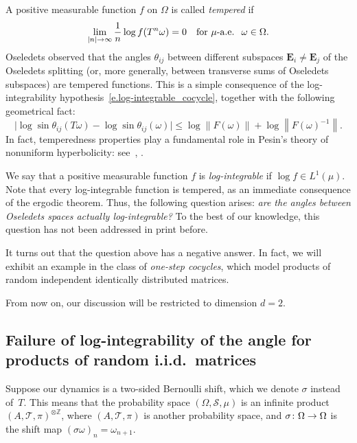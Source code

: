 \documentclass[10pt]{amsart}
\theoremstyle{definition}\newtheorem{defi}[theo]{Definition}\newtheorem{rema}[theo]{Remark}\newtheorem{exam}[theo]{Example}\newtheorem{exem}[theo]{Example}\newtheorem{nota}[theo]{Notation}
\newcommand{\Z}{\mathbb{Z}}
\newcommand{\E}{\mathbf{E}}
\newcommand{\clS}{\mathcal{S}}
\newcommand{\clT}{\mathcal{T}}
\renewcommand*{\to}{\mathchoice{\longrightarrow}{\rightarrow}{\rightarrow}{\rightarrow}}
\begin{document}
A positive measurable function $f$ on $\Omega$ is called \emph{tempered} if
\begin{equation}
\lim_{|n| \to \infty} \frac{1}{n} \log f(T^n \omega) = 0 \quad \text{for $\mu$-a.e. }\;\omega \in \Omega.
\end{equation}
Oseledets observed that the angles $\theta_{ij}$ between different subspaces $\E_i\neq \E_j$ of the Oseledets splitting (or, more generally, between transverse sums of Oseledets subspaces) are tempered functions. This is a simple consequence of the log-integrability hypothesis~\eqref{e.log-integrable_cocycle}, together with the following geometrical fact:
\begin{equation}\label{e.paralleloram}
\bigl| \log \sin \theta_{ij}(T \omega) - \log \sin \theta_{ij}(\omega) \bigr|
\le \log \|F(\omega)\| + \log \left\|F(\omega)^{-1}\right\|.
\end{equation}
In fact, temperedness properties play a fundamental role in Pesin's theory of nonuniform hyperbolicity: see~\cite{barreira}, \cite[Supplement]{KH}.

We say that a positive measurable function $f$ is \emph{log-integrable} if $\log f \in L^1(\mu)$. Note that every log-integrable function is tempered, as an immediate consequence of the ergodic theorem. Thus, the following question arises: \emph{are the angles between Oseledets spaces actually log-integrable?} To the best of our knowledge, this question has not been addressed in print before.

It turns out that the question above has a negative answer. In fact, we will exhibit an example in the class of \emph{one-step cocycles}, which model products of random independent identically distributed matrices.

From now on, our discussion will be restricted to dimension $d=2$.


\subsection{Failure of log-integrability of the angle for products of random i.i.d.~matrices}\label{ss.onestep}

Suppose our dynamics is a two-sided Bernoulli shift, which we denote $\sigma$ instead of~$T$. This means that the probability space $(\Omega,\clS,\mu)$ is an infinite product $(A,\clT,\pi)^{\otimes \Z}$, where $(A,\clT,\pi)$ is another probability space, and $\sigma \colon \Omega \to \Omega$ is the shift map ${(\sigma \omega)_n = \omega_{n+1}}$.
\end{document}
